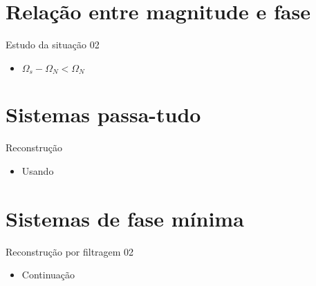 \section{Relação entre magnitude e fase}
\begin{slide}{Estudo da situação 02}
\begin{itemize}
   \item $\Omega_s-\Omega_N<\Omega_N$
   \begin{figure}
      \centering
   \end{figure}
\end{itemize}
\end{slide}

\section{Sistemas passa-tudo}
\begin{slide}{Reconstrução }
\begin{itemize}
   \item Usando %
   \begin{figure}
      \centering
   \end{figure}
\end{itemize}
\end{slide}

\section{Sistemas de fase mínima}
\begin{slide}{Reconstrução por filtragem 02}
\begin{itemize}
   \item Continuação
   \begin{figure}
      \centering
   \end{figure}
\end{itemize}
\end{slide}

